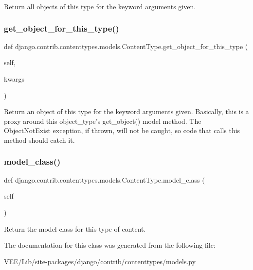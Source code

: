 \begin{DoxyVerb}Return all objects of this type for the keyword arguments given.
\end{DoxyVerb}
 \mbox{\label{classdjango_1_1contrib_1_1contenttypes_1_1models_1_1_content_type_a87d92aab8b23e24c21e82b7fe8edb42e}} 
\subsubsection{\texorpdfstring{get\+\_\+object\+\_\+for\+\_\+this\+\_\+type()}{get\_object\_for\_this\_type()}}
{\footnotesize\ttfamily def django.\+contrib.\+contenttypes.\+models.\+Content\+Type.\+get\+\_\+object\+\_\+for\+\_\+this\+\_\+type (\begin{DoxyParamCaption}\item[{}]{self,  }\item[{}]{kwargs }\end{DoxyParamCaption})}

\begin{DoxyVerb}Return an object of this type for the keyword arguments given.
Basically, this is a proxy around this object_type's get_object() model
method. The ObjectNotExist exception, if thrown, will not be caught,
so code that calls this method should catch it.
\end{DoxyVerb}
 \mbox{\label{classdjango_1_1contrib_1_1contenttypes_1_1models_1_1_content_type_a767f29de658300c34aaeb818ed6a47cd}} 
\subsubsection{\texorpdfstring{model\+\_\+class()}{model\_class()}}
{\footnotesize\ttfamily def django.\+contrib.\+contenttypes.\+models.\+Content\+Type.\+model\+\_\+class (\begin{DoxyParamCaption}\item[{}]{self }\end{DoxyParamCaption})}

\begin{DoxyVerb}Return the model class for this type of content.\end{DoxyVerb}
 

The documentation for this class was generated from the following file\+:\begin{DoxyCompactItemize}
\item 
V\+E\+E/\+Lib/site-\/packages/django/contrib/contenttypes/models.\+py\end{DoxyCompactItemize}
